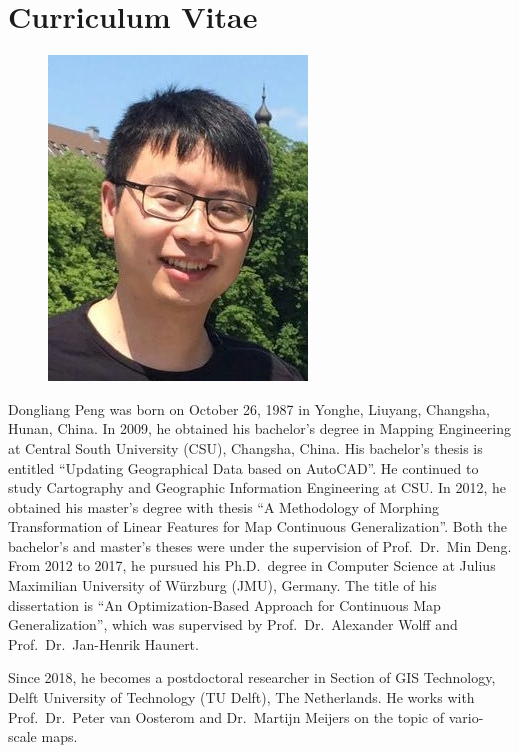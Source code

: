 
\chapter*{Curriculum Vitae}%
%

\begin{figure}
\centering
\vspace{-4.0mm}
\includegraphics[width=\linewidth]{images/peng_4x3.jpg}
\end{figure}

Dongliang Peng was born on October 26, 1987 
in Yonghe, Liuyang, Changsha, Hunan, China.
In 2009, he obtained his bachelor's degree in Mapping Engineering
at Central South University (CSU), Changsha, China.
His bachelor's thesis is entitled 
``Updating Geographical Data based on AutoCAD''.
He continued to study 
Cartography and Geographic Information Engineering at CSU.
In 2012, he obtained his master's degree with thesis 
``A Methodology of Morphing Transformation of Linear Features
for Map Continuous Generalization''.
Both the bachelor's and master's theses 
were under the supervision of Prof.\ Dr.\ Min Deng.
From 2012 to 2017, he pursued his Ph.D.\ degree in Computer Science
at Julius Maximilian University of Würzburg (JMU), Germany.
The title of his dissertation is
``An Optimization-Based Approach for Continuous Map Generalization'',
which was supervised by
Prof.\ Dr.\ Alexander Wolff and Prof.\ Dr.\ Jan-Henrik Haunert.


Since 2018, he becomes a postdoctoral researcher
in Section of GIS Technology,
Delft University of Technology (TU Delft), The Netherlands.
He works with Prof.\ Dr.\ Peter van Oosterom and
Dr.\ Martijn Meijers on the topic of vario-scale maps. 



